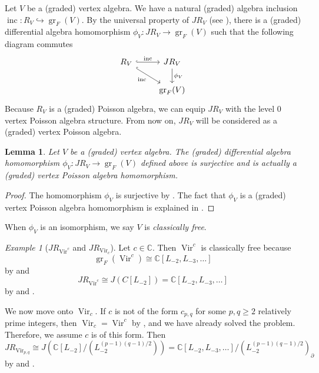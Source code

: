 \documentclass[a4paper, 12pt, reqno]{amsart}
\newtheorem{lemma}[theorem]{Lemma}
\theoremstyle{remark}
\newtheorem{example}[theorem]{Example}
\DeclareMathOperator{\Vir}{Vir}
\DeclareMathOperator{\gr}{gr}
\DeclareMathOperator{\inc}{inc}
\begin{document}
Let $V$ be a (graded) vertex algebra.
We have a natural (graded) algebra inclusion $\inc: R_V \hookrightarrow \gr_F(V)$.
By the universal property of $JR_V$ (see ), there is a (graded) differential algebra homomorphism $\phi_V: JR_V \to \gr_F(V)$ such that the following diagram commutes
\begin{equation*}
  \begin{tikzcd}
    R_V \arrow[rd, "\inc"', hook] \arrow[r, "\inc", hook] & JR_V \arrow[d, "\phi_V"] \\
    & \gr_F(V)
  \end{tikzcd}
\end{equation*}
Because $R_V$ is a (graded) Poisson algebra, we can equip $JR_V$ with the level 0 vertex Poisson algebra structure.
From now on, $JR_V$ will be considered as a (graded) vertex Poisson algebra.

\begin{lemma}
  \label{lmm:7}
  Let $V$ be a (graded) vertex algebra.
  The (graded) differential algebra homomorphism $\phi_V: JR_V \to \gr_F(V)$ defined above is surjective and is actually a (graded) vertex Poisson algebra homomorphism.
\end{lemma}

\begin{proof}
  The homomorphism $\phi_V$ is surjective by .
  The fact that $\phi_V$ is a (graded) vertex Poisson algebra homomorphism is explained in \cite[Proposition 2.5.1]{arakawa_remark_2012}.
\end{proof}

When $\phi_V$ is an isomorphism, we say $V$ is \emph{classically free}.

\begin{example}[$JR_{\Vir^c}$ and $JR_{\Vir_c}$]
  \label{exa:17}
  Let $c \in \mathbb{C}$.
  Then $\Vir^c$ is classically free because
  \begin{equation*}
    \gr_F(\Vir^c) \cong \mathbb{C}[L_{-2}, L_{-3}, \dots]
  \end{equation*}
  by  and
  \begin{equation*}
    JR_{\Vir^c} \cong J(C[L_{-2}]) = \mathbb{C}[L_{-2}, L_{-3}, \dots]
  \end{equation*}
  by  and .

  We now move onto $\Vir_c$.
  If $c$ is not of the form $c_{p, q}$ for some $p, q \ge 2$ relatively prime integers, then $\Vir_c = \Vir^c$ by , and we have already solved the problem.
  Therefore, we assume $c$ is of this form.
  Then
  \begin{equation*}
    JR_{\Vir_{p, q}} \cong J(\mathbb{C}[L_{-2}]/(L_{-2}^{(p - 1)(q - 1)/2})) = \mathbb{C}[L_{-2}, L_{-3}, \dots]/(L_{-2}^{(p - 1)(q - 1)/2})_{\partial}
  \end{equation*}
  by  and .
\end{example}
\end{document}
